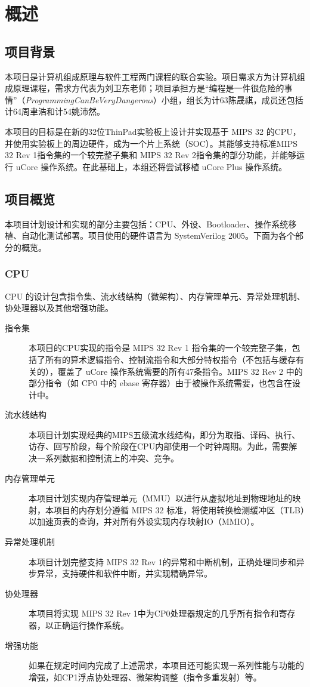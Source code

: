 \chapter{概述}

\section{项目背景}

本项目是计算机组成原理与软件工程两门课程的联合实验。项目需求方为计算机组成原理课程，需求方代表为刘卫东老师；项目承担方是“编程是一件很危险的事情”（\textit{ProgrammingCanBeVeryDangerous}）小组，组长为计63陈晟祺，成员还包括计64周聿浩和计54姚沛然。

本项目的目标是在新的32位ThinPad实验板上设计并实现基于 MIPS 32 的CPU，并使用实验板上的周边硬件，成为一个片上系统（SOC）。其能够支持标准MIPS 32 Rev 1指令集的一个较完整子集和 MIPS 32 Rev 2指令集的部分功能，并能够运行 uCore 操作系统。在此基础上，本组还将尝试移植 uCore Plus 操作系统。

\section{项目概览}

本项目计划设计和实现的部分主要包括：CPU、外设、Bootloader、操作系统移植、自动化测试部署。项目使用的硬件语言为 SystemVerilog 2005。下面为各个部分的概览。

\subsection{CPU}

CPU 的设计包含指令集、流水线结构（微架构）、内存管理单元、异常处理机制、协处理器以及其他增强功能。

\begin{description}

    \item[指令集] 本项目的CPU实现的指令是 MIPS 32 Rev 1 指令集的一个较完整子集，包括了所有的算术逻辑指令、控制流指令和大部分特权指令（不包括与缓存有关的），覆盖了 uCore 操作系统需要的所有47条指令。MIPS 32 Rev 2 中的部分指令（如 CP0 中的 ebase 寄存器）由于被操作系统需要，也包含在设计中。
    \item[流水线结构] 本项目计划实现经典的MIPS五级流水线结构，即分为取指、译码、执行、访存、回写阶段，每个阶段在CPU内部使用一个时钟周期。为此，需要解决一系列数据和控制流上的冲突、竞争。
    \item[内存管理单元] 本项目计划实现内存管理单元（MMU）以进行从虚拟地址到物理地址的映射，本项目的内存划分遵循 MIPS 32 标准，将使用转换检测缓冲区（TLB）以加速页表的查询，并对所有外设实现内存映射IO（MMIO）。
    \item[异常处理机制] 本项目计划完整支持 MIPS 32 Rev 1的异常和中断机制，正确处理同步和异步异常，支持硬件和软件中断，并实现精确异常。
    \item[协处理器] 本项目将实现 MIPS 32 Rev 1中为CP0处理器规定的几乎所有指令和寄存器，以正确运行操作系统。
    \item[增强功能] 如果在规定时间内完成了上述需求，本项目还可能实现一系列性能与功能的增强，如CP1浮点协处理器、微架构调整（指令多重发射）等。

\end{description}


